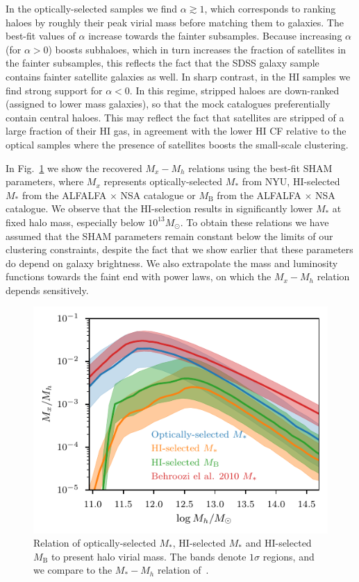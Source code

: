 \documentclass[usenatbib,useAMS]{mnras}
\newcommand{\HI}{\ensuremath{\mathrm{H}\scriptstyle\mathrm{I}}}
\newcommand{\matched}{ALFALFA $\times$ NSA }
\begin{document}
In the optically-selected samples we find $\alpha \gtrsim 1$, which corresponds to ranking haloes by roughly their peak virial mass before matching them to galaxies. The best-fit values of $\alpha$ increase towards the fainter subsamples. Because increasing $\alpha$ (for $\alpha > 0$) boosts subhaloes, which in turn increases the fraction of satellites in the fainter subsamples, this reflects the fact that the SDSS galaxy sample contains fainter satellite galaxies as well. In sharp contrast, in the $\HI$ samples we find strong support for $\alpha < 0$. In this regime, stripped haloes are down-ranked (assigned to lower mass galaxies), so that the mock catalogues preferentially contain central haloes. This may reflect the fact that satellites are stripped of a large fraction of their $\HI$ gas, in agreement with the lower $\HI$ CF relative to the optical samples where the presence of satellites boosts the small-scale clustering.

In Fig.~\ref{fig:Mh2Mxrelation} we show the recovered $M_x-M_h$ relations using the best-fit \ac{SHAM} parameters, where $M_x$ represents optically-selected $M_*$ from \ac{NYU}, $\HI$-selected $M_*$ from the \matched catalogue or $M_\mathrm{B}$ from the \matched catalogue. We observe that the $\HI$-selection results in significantly lower $M_*$ at fixed halo mass, especially below $10^{13} M_\odot$. To obtain these relations we have assumed that the \ac{SHAM} parameters remain constant below the limits of our clustering constraints, despite the fact that we show earlier that these parameters do depend on galaxy brightness. We also extrapolate the mass and luminosity functions towards the faint end with power laws, on which the $M_x-M_h$ relation depends sensitively.

\begin{figure}
    \centering
    \includegraphics[width=1.0\columnwidth]{Figures/Mx2Mh_relation.pdf}
    \caption{Relation of optically-selected $M_*$, $\HI$-selected $M_*$ and $\HI$-selected $M_{\mathrm{B}}$ to present halo virial mass. The bands denote $1\sigma$ regions, and we compare to the $M_*-M_h$ relation of~\citet{Behroozi2010}.}
    \label{fig:Mh2Mxrelation}
\end{figure}
\end{document}
